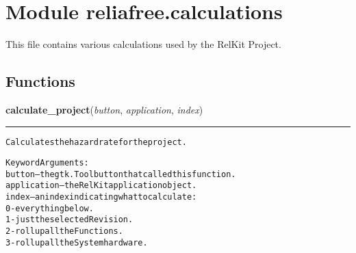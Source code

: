 %
%
%


\section{Module reliafree.calculations}

    \label{reliafree:calculations}
This file contains various calculations used by the RelKit Project.



  \subsection{Functions}

    \label{reliafree:calculations:calculate_project}

    \vspace{0.5ex}

\hspace{.8\funcindent}\begin{boxedminipage}{\funcwidth}

    \raggedright \textbf{calculate\_project}(\textit{button}, \textit{application}, \textit{index})

    \vspace{-1.5ex}

    \rule{\textwidth}{0.5\fboxrule}
\setlength{\parskip}{2ex}
\begin{alltt}
Calculates the hazard rate for the project.

Keyword Arguments:
button      -- the gtk.Toolbutton that called this function.
application -- the RelKit application object.
index       -- an index indicating what to calculate:
               0 - everything below.
               1 - just the selected Revision.
               2 - roll up all the Functions.
               3 - roll up all the System hardware.
\end{alltt}

\setlength{\parskip}{1ex}
    \end{boxedminipage}

